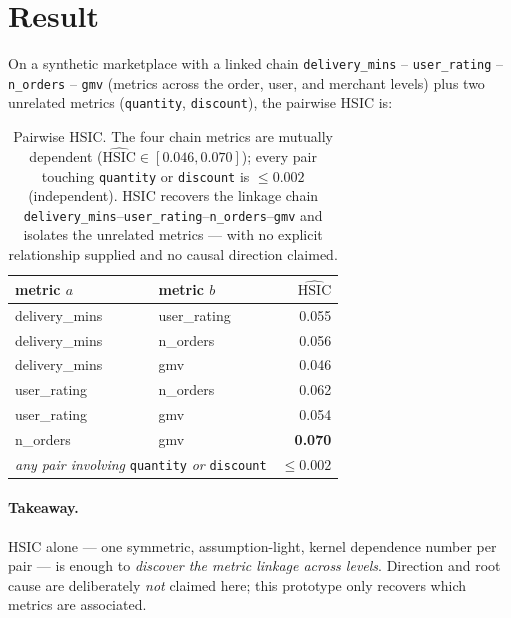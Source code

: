 \documentclass[11pt]{article}
\newcommand{\HSIC}{\mathrm{HSIC}}
\begin{document}
\section{Result}

On a synthetic marketplace with a linked chain
\texttt{delivery\_mins} -- \texttt{user\_rating} -- \texttt{n\_orders} --
\texttt{gmv} (metrics across the order, user, and merchant levels) plus two
unrelated metrics (\texttt{quantity}, \texttt{discount}), the pairwise HSIC is:

\begin{table}[h]
\centering
\begin{tabular}{llr}
\toprule
metric $a$ & metric $b$ & $\widehat{\HSIC}$ \\
\midrule
delivery\_mins & user\_rating & 0.055 \\
delivery\_mins & n\_orders    & 0.056 \\
delivery\_mins & gmv          & 0.046 \\
user\_rating   & n\_orders    & 0.062 \\
user\_rating   & gmv          & 0.054 \\
n\_orders      & gmv          & \textbf{0.070} \\
\midrule
\multicolumn{2}{l}{\emph{any pair involving} \texttt{quantity} \emph{or} \texttt{discount}}
 & $\le 0.002$ \\
\bottomrule
\end{tabular}
\caption{Pairwise HSIC. The four chain metrics are mutually dependent
($\widehat{\HSIC}\in[0.046,0.070]$); every pair touching \texttt{quantity} or
\texttt{discount} is $\le 0.002$ (independent). HSIC recovers the linkage chain
\texttt{delivery\_mins}--\texttt{user\_rating}--\texttt{n\_orders}--\texttt{gmv}
and isolates the unrelated metrics --- with no explicit relationship supplied and
no causal direction claimed.}
\end{table}

\paragraph{Takeaway.} HSIC alone --- one symmetric, assumption-light, kernel
dependence number per pair --- is enough to \emph{discover the metric linkage
across levels}. Direction and root cause are deliberately \emph{not} claimed
here; this prototype only recovers which metrics are associated.
\end{document}
